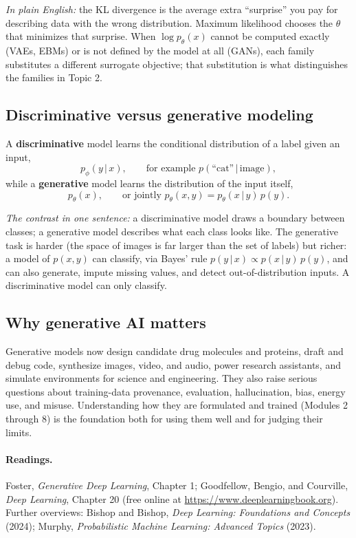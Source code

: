 \documentclass[11pt]{article}
\newcommand{\given}{\,\vert\,}
\theoremstyle{remark}
\begin{document}
\noindent\textit{In plain English:} the KL divergence is the average extra ``surprise'' you pay for describing data with the wrong distribution. Maximum likelihood chooses the $\theta$ that minimizes that surprise. When $\log p_\theta(x)$ cannot be computed exactly (VAEs, EBMs) or is not defined by the model at all (GANs), each family substitutes a different surrogate objective; that substitution is what distinguishes the families in Topic 2.

\subsection{Discriminative versus generative modeling}

A \textbf{discriminative} model learns the conditional distribution of a label given an input,
\[
p_\phi(y \given x), \qquad \text{for example } p(\text{``cat''} \given \text{image}),
\]
while a \textbf{generative} model learns the distribution of the input itself,
\[
p_\theta(x), \qquad \text{or jointly } p_\theta(x, y) = p_\theta(x \given y)\, p(y).
\]

\noindent\textit{The contrast in one sentence:} a discriminative model draws a boundary between classes; a generative model describes what each class looks like. The generative task is harder (the space of images is far larger than the set of labels) but richer: a model of $p(x, y)$ can classify, via Bayes' rule $p(y \given x) \propto p(x \given y)\,p(y)$, and can also generate, impute missing values, and detect out-of-distribution inputs. A discriminative model can only classify.

\subsection{Why generative AI matters}

Generative models now design candidate drug molecules and proteins, draft and debug code, synthesize images, video, and audio, power research assistants, and simulate environments for science and engineering. They also raise serious questions about training-data provenance, evaluation, hallucination, bias, energy use, and misuse. Understanding how they are formulated and trained (Modules 2 through 8) is the foundation both for using them well and for judging their limits.

\paragraph{Readings.} Foster, \emph{Generative Deep Learning}, Chapter 1; Goodfellow, Bengio, and Courville, \emph{Deep Learning}, Chapter 20 (free online at \url{https://www.deeplearningbook.org}). Further overviews: Bishop and Bishop, \emph{Deep Learning: Foundations and Concepts} (2024); Murphy, \emph{Probabilistic Machine Learning: Advanced Topics} (2023).
\end{document}

